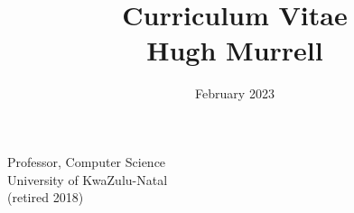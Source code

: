 \documentclass[12pt]{article}
\title{ Curriculum Vitae \\
           Hugh Murrell \\
        \vspace{0.5cm} }
\date{February 2023}
\begin{document}
\maketitle


\begin{figure}[ht]
\end{figure}
\begin{flushright}
\vspace{1.5cm}
\vspace{0.5cm}
Professor, Computer Science \\ 
University of KwaZulu-Natal \\
(retired  2018) \\

\end{flushright}

\newpage


\newpage

\newpage

\newpage

\newpage





\newpage

\newpage

\end{document}
